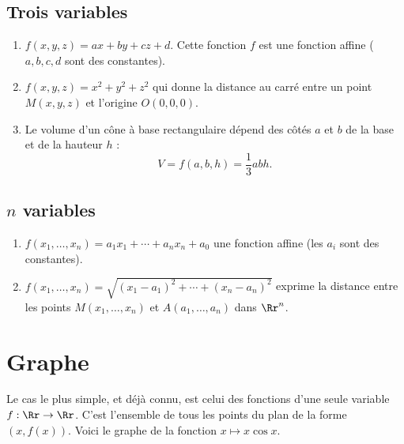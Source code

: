 \documentclass[11pt,class=report,crop=false]{standalone}
\begin{document}
\subsection{Trois variables}

\begin{exemple}
\sauteligne
\begin{enumerate}
  \item $f(x,y,z) = ax+by+cz+d$. Cette fonction $f$ est une fonction affine ($a,b,c,d$ sont des constantes).
   \item $f(x,y,z) = x^2+y^2+z^2$ qui donne la distance au carré entre un point $M(x,y,z)$ et l'origine $O(0,0,0)$.
   \item Le volume d'un cône à base rectangulaire dépend des côtés $a$ et $b$ de la base et de la hauteur $h$ :
   $$V = f(a,b,h) = \frac13 abh.$$
   
     
\end{enumerate}
\end{exemple}


\subsection{$n$ variables}

\begin{exemple}
\sauteligne
\begin{enumerate}
  \item $f(x_1,\ldots,x_n) = a_1x_1+\cdots+a_nx_n+a_0$ une fonction affine (les $a_i$ sont des constantes).
  \item $f(x_1,\ldots,x_n) = \sqrt{(x_1-a_1)^2+\cdots+(x_n-a_n)^2}$ exprime la distance entre les points $M(x_1,\ldots,x_n)$ et $A(a_1,\ldots,a_n)$ dans $\Rr^n$.
\end{enumerate}
\end{exemple}


\section{Graphe}

Le cas le plus simple, et déjà connu, est celui des fonctions d'une seule variable $f : \Rr \rightarrow \Rr$.  C'est l'ensemble de tous les points du plan de la forme $(x,f(x))$. Voici le graphe de la fonction $x \mapsto x\cos x$.
\end{document}
